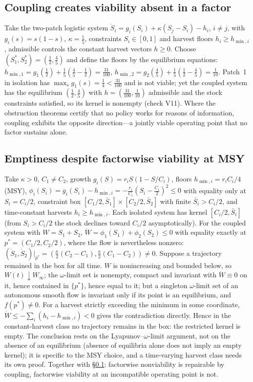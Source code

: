 \documentclass[11pt,a4paper]{article}
\theoremstyle{plain}
\theoremstyle{definition}
\theoremstyle{remark}
\begin{document}
\subsection{Coupling creates viability absent in a factor}\label{S:A1}
Take the two-patch logistic system $\dot S_i=g_i(S_i)+\kappa(S_j-S_i)-h_i$, $i\ne j$, with $g_i(s)=s(1-s)$, $\kappa=\tfrac15$, constraints $S_i\in[0,1]$ and harvest floors $h_i\ge h_{\min,i}$, admissible controls the constant harvest vectors $h\ge0$. Choose $(S_1^*,S_2^*)=(\tfrac12,\tfrac45)$ and define the floors by the equilibrium equations: $h_{\min,1}=g_1(\tfrac12)+\tfrac15(\tfrac45-\tfrac12)=\tfrac{31}{100}$, $h_{\min,2}=g_2(\tfrac45)+\tfrac15(\tfrac12-\tfrac45)=\tfrac1{10}$. Patch~1 in isolation has $\max_sg_1(s)=\tfrac14<\tfrac{31}{100}$ and is not viable; yet the coupled system has the equilibrium $(\tfrac12,\tfrac45)$ with $h=(\tfrac{31}{100},\tfrac1{10})$ admissible and the stock constraints satisfied, so its kernel is nonempty (check V11). Where the obstruction theorems certify that no policy works for reasons of information, coupling exhibits the opposite direction---a jointly viable operating point that no factor sustains alone.

\subsection{Emptiness despite factorwise viability at MSY}\label{S:A2}
Take $\kappa>0$, $C_1\ne C_2$, growth $g_i(S)=r_iS(1-S/C_i)$, floors $h_{\min,i}=r_iC_i/4$ (MSY), $\phi_i(S_i)=g_i(S_i)-h_{\min,i}=-\tfrac{r_i}{C_i}(S_i-\tfrac{C_i}2)^2\le0$ with equality only at $S_i=C_i/2$, constraint box $[C_1/2,\bar S_1]\times[C_2/2,\bar S_2]$ with finite $\bar S_i>C_i/2$, and time-constant harvests $h_i\ge h_{\min,i}$. Each isolated system has kernel $[C_i/2,\bar S_i]$ (from $S_i>C_i/2$ the stock declines toward $C_i/2$ asymptotically). For the coupled system with $W=S_1+S_2$, $\dot W=\phi_1(S_1)+\phi_2(S_2)\le0$ with equality exactly at $p^*=(C_1/2,C_2/2)$, where the flow is nevertheless nonzero: $(\dot S_1,\dot S_2)|_{p^*}=(\tfrac\kappa2(C_2-C_1),\tfrac\kappa2(C_1-C_2))\ne0$. Suppose a trajectory remained in the box for all time. $W$ is nonincreasing and bounded below, so $W(t)\downarrow W_\infty$; the $\omega$-limit set is nonempty, compact and invariant with $\dot W\equiv0$ on it, hence contained in $\{p^*\}$, hence equal to it; but a singleton $\omega$-limit set of an autonomous smooth flow is invariant only if its point is an equilibrium, and $f(p^*)\ne0$. For a harvest strictly exceeding the minimum in some coordinate, $\dot W\le-\sum_i(h_i-h_{\min,i})<0$ gives the contradiction directly. Hence in the constant-harvest class no trajectory remains in the box: the restricted kernel is empty. The conclusion rests on the Lyapunov--$\omega$-limit argument, not on the absence of an equilibrium (absence of equilibria alone does not imply an empty kernel); it is specific to the MSY choice, and a time-varying harvest class needs its own proof. Together with \S\ref{S:A1}: factorwise nonviability is repairable by coupling, factorwise viability at an incompatible operating point is not.
\end{document}
